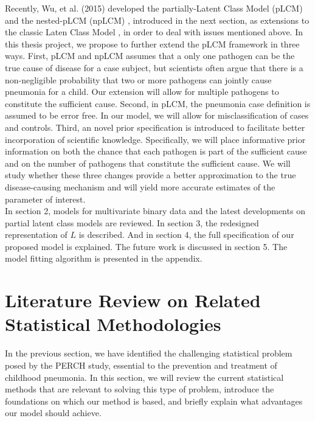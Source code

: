 \documentclass[11 pt, a4paper]{article}  %
\begin{document}
Recently, Wu, et al. (2015) developed the partially-Latent Class Model (pLCM)\cite{wu2015partially} and the nested-pLCM (npLCM) \cite{wu2015nested}, introduced in the next section, as extensions to the classic Laten Class Model \cite{goodman1974exploratory}, in order to deal with issues mentioned above. In this thesis project, we propose to further extend the pLCM framework in three ways. First, pLCM and npLCM assumes that a only one pathogen can be the true cause of disease for a case subject, but scientists often argue that there is a non-negligible probability that two or more pathogens can jointly cause pneumonia for a child. Our extension will allow for multiple pathogens to constitute the sufficient cause\cite{rothman2008modern}. Second, in pLCM, the pneumonia case definition is assumed to be error free. In our model, we will allow for misclassification of cases and controls. Third, an novel prior specification is introduced to facilitate better incorporation of scientific knowledge. Specifically, we will place informative prior information on both the chance that each pathogen is part of the sufficient cause and on the number of pathogens that constitute the sufficient cause. We will study whether these three changes provide a better approximation to the true disease-causing mechanism and will yield more accurate estimates of the parameter of interest.\\

In section 2, models for multivariate binary data and the latest developments on partial latent class models are reviewed. In section 3, the redesigned representation of $L$ is described. And in section 4, the full specification of our proposed model is explained. The future work is discussed in section 5. The model fitting algorithm is presented in the appendix.
 
\newpage
\section{Literature Review on Related Statistical Methodologies}
In the previous section, we have identified the challenging statistical problem posed by the PERCH study, essential to the prevention and treatment of childhood pneumonia. In this section, we will review the current statistical methods that are relevant to solving this type of problem, introduce the foundations on which our method is based, and briefly explain what advantages our model should achieve.
\end{document}
